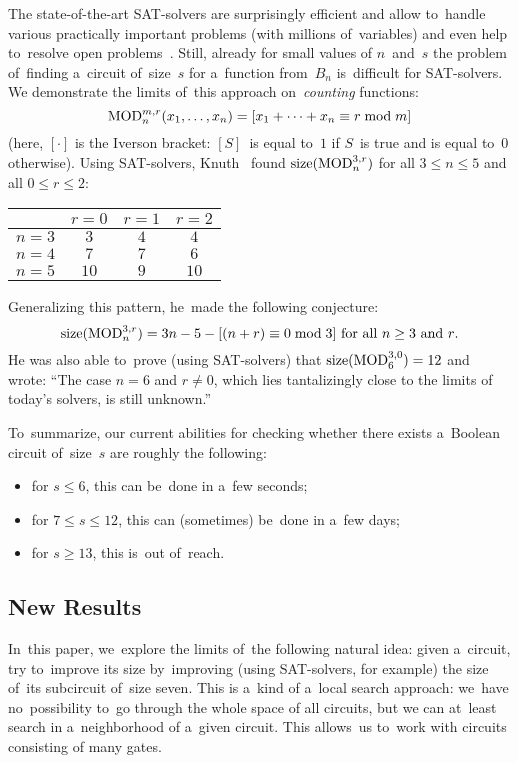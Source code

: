 The state-of-the-art SAT-solvers are surprisingly efficient and allow to~handle
various practically important problems (with millions
of~variables) and even help to~resolve open
problems~\cite{DBLP:conf/cade/BrakensiekHMN20}.
Still, already for small values of $n$~and~$s$ the problem
of~finding a~circuit of~size~$s$ for a~function from~$B_n$
is~difficult for SAT-solvers.
We demonstrate the limits
of~this approach on~\emph{counting} functions:
\begin{equation}\label{eq:mod}
    \operatorname{MOD}_n^{m,r}(x_1, \dotsc, x_n)=[x_1+\dotsb+x_n \equiv r \bmod m]
\end{equation}
(here, $[\cdot]$ is the Iverson bracket: $[S]$~is equal to~$1$ if $S$~is true and is equal to~$0$ otherwise).
Using SAT-solvers, Knuth~\cite[solution to exercise~$480$]{Knuth:2015:ACP:2898950}
found $\operatorname{size}(\operatorname{MOD}_n^{3,r})$ for all $3 \le n \le 5$ and all $0 \le r \le 2$:
\begin{center}
    \begin{tabular}{lccc}
        \toprule
              & $r=0$ & $r=1$ & $r=2$\\
        \midrule
        $n=3$ & $3$ & $4$ & $4$\\
        $n=4$ & $7$ & $7$ & $6$\\
        $n=5$ & $10$ & $9$ & $10$\\
        \bottomrule
    \end{tabular}
\end{center}
Generalizing this pattern, he~made the following conjecture:
\begin{equation}\label{conjecture}
\operatorname{size}(\operatorname{MOD}_n^{3,r})=3n-5-[(n+r) \equiv 0\bmod 3] \text{ for all $n \ge 3$ and $r$.}
\end{equation}
He was also able to~prove (using SAT-solvers)
that $\operatorname{size}(\operatorname{MOD}_6^{3,0})=12$
and wrote:
``The case $n=6$ and $r \neq 0$, which lies tantalizingly close to the limits of
today's solvers, is still unknown.''

To~summarize, our current abilities for checking whether there exists a~Boolean circuit of~size~$s$ are roughly the following:
\begin{itemize}
\item for $s \le 6$, this can be~done in a~few seconds;
\item for $7 \le s \le 12$, this can (sometimes)
be~done in a~few days;
\item for $s \ge 13$, this is~out of~reach.
\end{itemize}

\subsection{New Results}
In~this paper, we~explore the limits of~the following natural idea: given a~circuit, try to~improve its size by~improving (using SAT-solvers, for example) the size
of~its subcircuit of~size seven. This is a~kind of a~local search approach: we~have no~possibility to~go through the whole space of all circuits, but we can at~least
search in a~neighborhood of a~given circuit.
This allows~us to~work with circuits consisting
of many gates.

